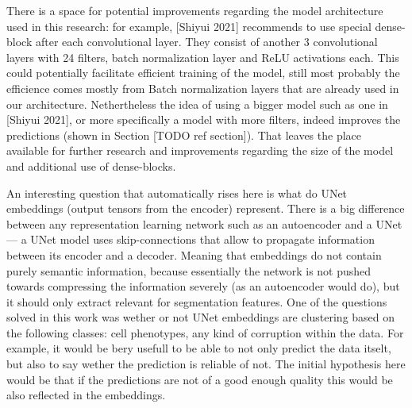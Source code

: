 There is a space for potential improvements regarding the model architecture used in this research: for example, [Shiyui 2021] recommends to use special dense-block after each convolutional layer. They consist of another 3 convolutional layers with 24 filters, batch normalization layer and ReLU activations each. This could potentially facilitate efficient training of the model, still most probably the efficience comes mostly from Batch normalization layers that are already used in our architecture. Nethertheless the idea of using a bigger model such as one in [Shiyui 2021], or more specifically a model with more filters, indeed improves the predictions (shown in Section [TODO ref section]). That leaves the place available for further research and improvements regarding the size of the model and additional use of dense-blocks. 

An interesting question that automatically rises here is what do UNet embeddings (output tensors from the encoder) represent. There is a big difference between any representation learning network such as an autoencoder and a UNet --- a UNet model uses skip-connections that allow to propagate information between its encoder and a decoder. Meaning that embeddings do not contain purely semantic information, because essentially the network is not pushed towards compressing the information severely (as an autoencoder would do), but it should only extract relevant for segmentation features. One of the questions solved in this work was wether or not UNet embeddings are clustering based on the following classes: cell phenotypes, any kind of corruption within the data. For example, it would be bery usefull to be able to not only predict the data itselt, but also to say wether the prediction is reliable of not. The initial hypothesis here would be that if the predictions are not of a good enough quality this would be also reflected in the embeddings. 